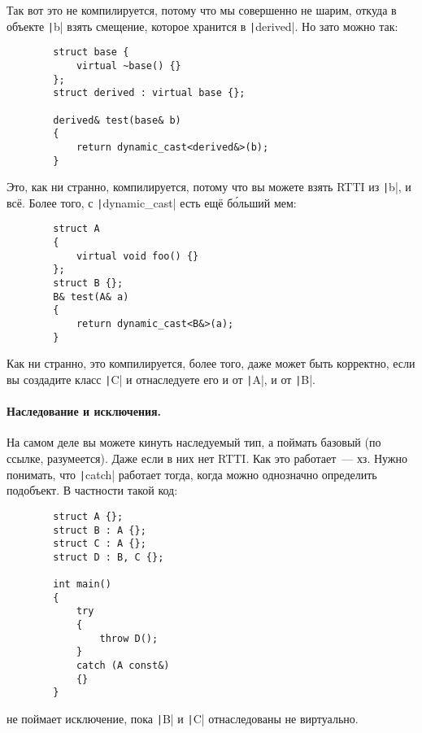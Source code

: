 \documentclass{article}
\begin{document}
    Так вот это не компилируется, потому что мы совершенно не шарим, откуда в объекте \texttt|b| взять смещение, которое хранится в \texttt|derived|. Но зато можно так:
    \begin{verbatim}
        struct base {
            virtual ~base() {}
        };
        struct derived : virtual base {};

        derived& test(base& b)
        {
            return dynamic_cast<derived&>(b);
        }
    \end{verbatim}
    Это, как ни странно, компилируется, потому что вы можете взять RTTI из \texttt|b|, и всё. Более того, с \texttt|dynamic_cast| есть ещё б\'{о}льший мем:
    \begin{verbatim}
        struct A
        {
            virtual void foo() {}
        };
        struct B {};
        B& test(A& a)
        {
            return dynamic_cast<B&>(a);
        }
    \end{verbatim}
    Как ни странно, это компилируется, более того, даже может быть корректно, если вы создадите класс \texttt|C| и отнаследуете его и от \texttt|A|, и от \texttt|B|.
    \paragraph{Наследование и исключения.}
    На самом деле вы можете кинуть наследуемый тип, а поймать базовый (по ссылке, разумеется). Даже если в них нет RTTI. Как это работает~--- хз. Нужно понимать, что \texttt|catch| работает тогда, когда можно однозначно определить подобъект. В частности такой код:
    \begin{verbatim}
        struct A {};
        struct B : A {};
        struct C : A {};
        struct D : B, C {};

        int main()
        {
            try
            {
                throw D();
            }
            catch (A const&)
            {}
        }
    \end{verbatim}
    не поймает исключение, пока \texttt|B| и \texttt|C| отнаследованы не виртуально.
\end{document}
